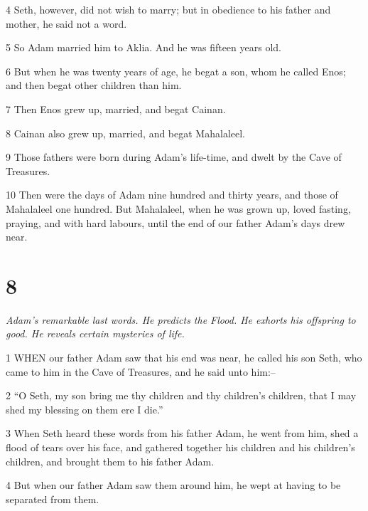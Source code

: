 \par 4 Seth, however, did not wish to marry; but in obedience to his father and mother, he said not a word.

\par 5 So Adam married him to Aklia. And he was fifteen years old.

\par 6 But when he was twenty years of age, he begat a son, whom he called Enos; and then begat other children than him.

\par 7 Then Enos grew up, married, and begat Cainan.

\par 8 Cainan also grew up, married, and begat Mahalaleel.

\par 9 Those fathers were born during Adam's life-time, and dwelt by the Cave of Treasures.

\par 10 Then were the days of Adam nine hundred and thirty years, and those of Mahalaleel one hundred. But Mahalaleel, when he was grown up, loved fasting, praying, and with hard labours, until the end of our father Adam's days drew near.

\chapter{8}

\par \textit{Adam's remarkable last words. He predicts the Flood. He exhorts his offspring to good. He reveals certain mysteries of life.}

\par 1 WHEN our father Adam saw that his end was near, he called his son Seth, who came to him in the Cave of Treasures, and he said unto him:--

\par 2 “O Seth, my son bring me thy children and thy children's children, that I may shed my blessing on them ere I die.”

\par 3 When Seth heard these words from his father Adam, he went from him, shed a flood of tears over his face, and gathered together his children and his children's children, and brought them to his father Adam.

\par 4 But when our father Adam saw them around him, he wept at having to be separated from them.

